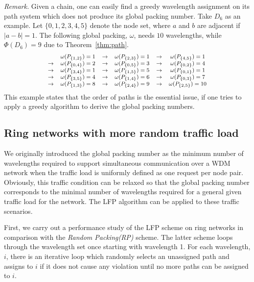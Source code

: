 \documentclass[journal,draftcls,onecolumn,12pt,twoside]{IEEEtran}
\begin{document}
\noindent \emph{Remark.} 
Given a chain, one can easily find a greedy wavelength assignment on its path system which does not produce its global packing number.
Take $D_6$ as an example.
Let $\{0,1,2,3,4,5\}$ denote the node set, where $a$ and $b$ are adjacent if $|a-b|=1$.
The following global packing, $\omega$, needs $10$ wavelengths, while $\Phi(D_6)=9$ due to Theorem~\ref{thm:path}.
$$
\footnotesize
\begin{array}{cccccc}
 & \omega(P_{\{1,2\}})=1 & \rightarrow & \omega(P_{\{2,3\}})=1 & \rightarrow & \omega(P_{\{4,5\}})=1 \\
\rightarrow & \omega(P_{\{0,4\}})=2 & \rightarrow & \omega(P_{\{0,5\}})=3 & \rightarrow & \omega(P_{\{0,2\}})=4 \\
\rightarrow & \omega(P_{\{3,4\}})=1 & \rightarrow & \omega(P_{\{1,5\}})=5 & \rightarrow & \omega(P_{\{0,1\}})=1 \\
\rightarrow & \omega(P_{\{3,5\}})=4 & \rightarrow & \omega(P_{\{1,4\}})=6 & \rightarrow & \omega(P_{\{0,3\}})=7 \\
\rightarrow & \omega(P_{\{1,3\}})=8 & \rightarrow & \omega(P_{\{2,4\}})=9 & \rightarrow & \omega(P_{\{2,5\}})=10 
\end{array}
\normalsize
$$
This example states that the order of paths is the essential issue, if one tries to apply a greedy algorithm to derive the global packing numbers.


\subsection{Ring networks with more random traffic load}
We originally introduced the global packing number as the minimum number of wavelengths
required to support simultaneous communication over a WDM network when the traffic
load is uniformly defined as one request per node pair.  Obviously, this traffic condition can be relaxed so that the global packing number corresponds to the minimal
number of wavelengths required for a general given traffic load for the network.
The LFP algorithm can be applied to these traffic scenarios.

First, we carry out a performance study of the LFP scheme on ring networks in comparison
with the \emph{Random Packing(RP)} scheme.  The latter scheme loops through
the wavelength set once starting with wavelength 1.  For each wavelength, $i$, there
is an iterative loop which randomly selects an unassigned path and assigns to $i$ if it does not cause any violation until no more paths can be assigned to $i$.
\end{document}
